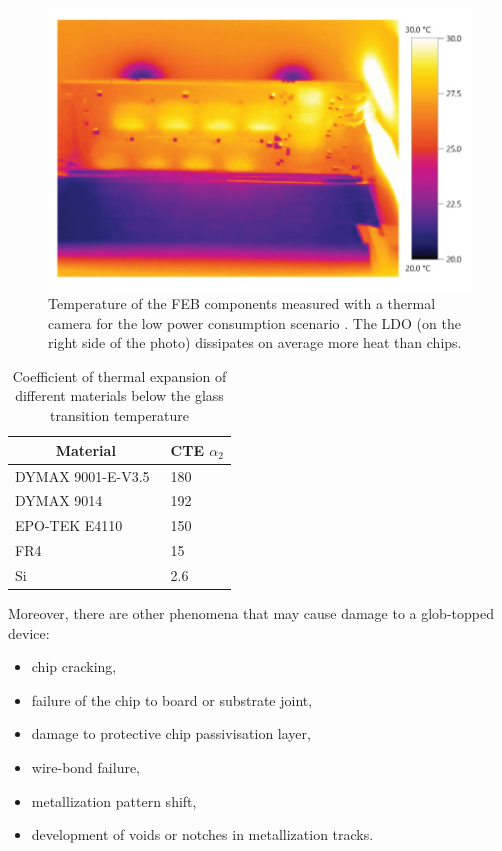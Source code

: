 \begin{figure}[!h]
\centering
\includegraphics[width=0.6\columnwidth]{Chapter4/images/feb_thermal.jpg}
\caption{Temperature of the \gls{FEB} components measured with a thermal camera for the low power consumption scenario \cite{leo_electronics}. The \gls{LDO} (on the right side of the photo) dissipates on average more heat than chips.}
\label{fig_temperatures_camera}
\end{figure}


\begin{table}[!h]
\begin{center}
\begin{tabular}{ll}
\hline
\multicolumn{1}{c}{Material} & \multicolumn{1}{c}{CTE $\alpha_{2}$} [\si{\micro\metre\per\metre\per\celsius]}] \\ \hline
DYMAX 9001-E-V3.5~\cite{9001}            & 180                                  \\
DYMAX 9014~\cite{9014}                   & 192                                  \\
EPO-TEK E4110~\cite{4110}                & 150                                  \\ \hline
FR4~\cite{FR4}                          & 15                                   \\
Si~\cite{Si}                           & 2.6                                 
\end{tabular}
\label{TCE}
\caption{Coefficient of thermal expansion of different materials below the glass transition temperature}
\end{center}
\end{table}

\newpage


Moreover, there are other phenomena that may cause damage to a glob-topped device:
\begin{itemize}
    \item chip cracking,
    \item failure of the chip to board or substrate joint,
    \item damage to protective chip passivisation layer,
    \item wire-bond failure,
    \item metallization pattern shift,
    \item development of voids or notches in metallization tracks. 
\end{itemize}


